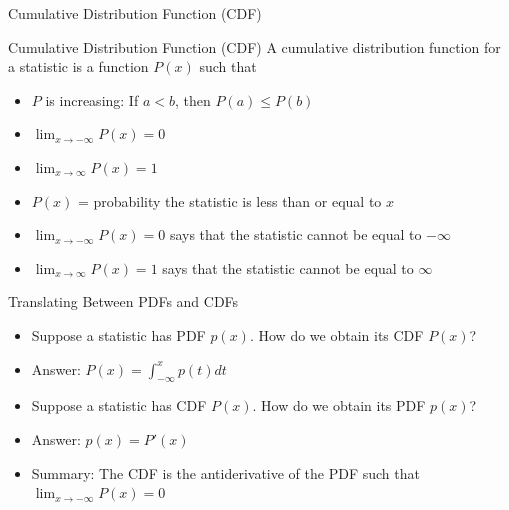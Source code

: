 \documentclass{beamer}
\begin{document}
\begin{frame}{Cumulative Distribution Function (CDF)}
    \begin{block}{Cumulative Distribution Function (CDF)}
    A cumulative distribution function for a statistic is a function $P(x)$ such that \begin{itemize}
        \item $P$ is increasing: If $a < b$, then $P(a) \leq P(b)$
        \item $\lim_{x \to -\infty} P(x) = 0$
        \item $\lim_{x \to \infty} P(x) = 1$
    \end{itemize}        
    \end{block}

    \begin{itemize}
        \item $P(x)$ = probability the statistic is less than or equal to $x$
        \item $\lim_{x \to -\infty} P(x) = 0$ says that the statistic cannot be equal to $-\infty$ 
        \item $\lim_{x \to \infty} P(x) = 1$ says that the statistic cannot be equal to $\infty$
    \end{itemize} 
    
\end{frame}

\begin{frame}{Translating Between PDFs and CDFs}
    \begin{itemize}
        \item<1-> Suppose a statistic has PDF $p(x)$. How do we obtain its CDF $P(x)$?
        \item<2-> Answer: $P(x) = \int_{-\infty}^x p(t)dt$

        \vfill

        \item<3-> Suppose a statistic has CDF $P(x)$. How do we obtain its PDF $p(x)$?
        \item<4-> Answer: $p(x) = P'(x)$

        \vfill 

        \item<5-> Summary: The CDF is the antiderivative of the PDF such that $\lim_{x \to -\infty} P(x) = 0$
    \end{itemize}
    
\end{frame}
\end{document}
